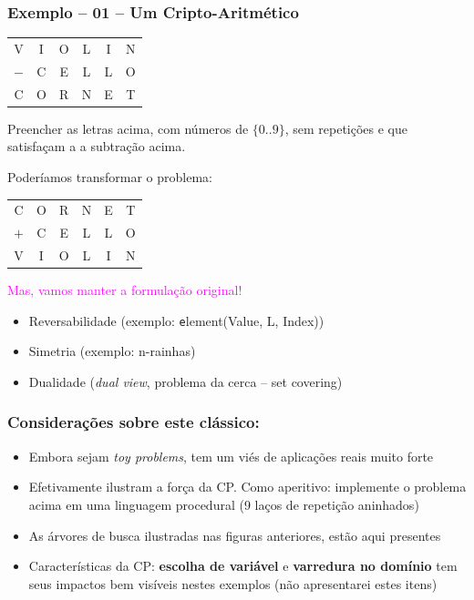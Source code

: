 \documentclass{beamer}
\begin{document}
\begin{frame}[fragile] 

\frametitle{Exemplo -- 01 -- Um Cripto-Aritmético}


\begin{center}
\begin{tabular}{cccccc}
V & I & O & L & I & N \\
  $-$ & C & E & L & L & O \\ \hline
C & O & R & N & E & T 
\end{tabular}
\end{center}
Preencher as letras acima, com números de $\{0..9\}$, sem repetições e que satisfaçam a a subtração  acima.
\vfill

\pause
Poderíamos transformar o problema:
\begin{center}
\begin{tabular}{cccccc}
C & O & R & N & E & T \\
 $+$ & C & E & L & L & O \\ \hline
V & I & O & L & I & N 
\end{tabular}
\end{center}

\textcolor{magenta}{Mas, vamos manter a formulação original!}

\begin{itemize}
    \item Reversabilidade (exemplo: {\texttt element(Value, L, Index))}
    \item Simetria (exemplo: n-rainhas) 
    \item Dualidade ({\em dual view}, problema da cerca -- set covering)
\end{itemize}


\end{frame}
\begin{frame}[fragile] 

\frametitle{Considerações sobre este clássico:}

\begin{itemize}
    \item Embora sejam {\em toy problems}, tem um viés de aplicações reais muito forte
    
    \item Efetivamente ilustram a força da CP. Como aperitivo: implemente o problema acima em uma linguagem procedural (9 laços de repetição aninhados)
    
    \item As árvores de busca ilustradas nas figuras anteriores, estão aqui presentes
    
    \item Características da CP: {\bf escolha de variável} e {\bf varredura no domínio} tem seus impactos bem visíveis nestes exemplos
    (não apresentarei estes itens)
    
\end{itemize}

\end{frame}
\end{document}
